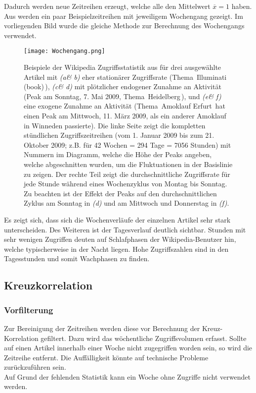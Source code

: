 \documentclass[fontsize=11pt, twoside, a4paper]{scrartcl}
\begin{document}
Dadurch werden neue Zeitreihen erzeugt, welche alle den Mittelwert $\overline{x} = 1$ haben.\\
Aus \cite{Burst} werden ein paar Beispielzeitreihen mit jeweiligem Wochengang gezeigt. Im vorliegenden Bild wurde die gleiche Methode zur Berechnung des Wochengangs verwendet. 
\begin{figure}[H]
	\centering
	\texttt{[image: Wochengang.png]}
	\caption{Beispiele der Wikipedia Zugriffsstatistik aus \cite{Burst} für drei ausgewählte Artikel mit \textit{(a\& b)} eher stationärer Zugriffsrate (Thema \,\glqq Illuminati (book)\grqq\,), \textit{(c\& d)} mit plötzlicher endogener Zunahme an Aktivität (Peak am Sonntag, 7. Mai 2009, Thema \,\glqq Heidelberg\grqq\,), und \textit{(e\& f)} eine exogene Zunahme an Aktivität (Thema \,\glqq Amoklauf Erfurt\grqq\, hat einen Peak am Mittwoch, 11. März 2009, als ein anderer Amoklauf in Winneden passierte). Die linke Seite zeigt die kompletten stündlichen Zugriffszeitreihen (vom 1. Januar 2009 bis zum 21. Oktober 2009; z.B. für 42 Wochen = 294 Tage = 7056 Stunden) mit Nummern im Diagramm, welche die Höhe der Peaks angeben, welche abgeschnitten wurden, um die Fluktuationen in der Basislinie zu zeigen. Der rechte Teil zeigt die durchschnittliche Zugriffsrate für jede Stunde während eines Wochenzyklus von Montag bis Sonntag. Zu beachten ist der Effekt der Peaks auf den durchschnittlichen Zyklus am Sonntag in \textit{(d)} und am Mittwoch und Donnerstag in \textit{(f)}.}
\end{figure}
Es zeigt sich, dass sich die Wochenverläufe der einzelnen Artikel sehr stark unterscheiden. Des Weiteren ist der Tagesverlauf deutlich sichtbar. Stunden mit sehr wenigen Zugriffen deuten auf Schlafphasen der Wikipedia-Benutzer hin, welche typischerweise in der Nacht liegen. Hohe Zugriffszahlen sind in den Tagesstunden und somit Wachphasen zu finden.


\subsection{Kreuzkorrelation}

\subsubsection{Vorfilterung}
Zur Bereinigung der Zeitreihen werden diese vor Berechnung der Kreuz-Korrelation gefiltert. Dazu wird das wöchentliche Zugriffsvolumen erfasst. Sollte auf einen Artikel innerhalb einer Woche nicht zugegriffen worden sein, so wird die Zeitreihe entfernt. Die Auffälligkeit könnte auf technische Probleme zurückzuführen sein.\\
Auf Grund der fehlenden Statistik kann ein Woche ohne Zugriffe nicht verwendet werden.
\end{document}
